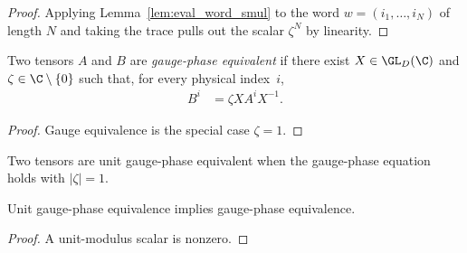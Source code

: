 \begin{proof}\leanok
    Applying Lemma~\ref{lem:eval_word_smul} to the word
    $w = (i_1, \ldots, i_N)$ of length $N$ and taking the trace pulls out the
    scalar $\zeta^{N}$ by linearity.
\end{proof}

\begin{definition}\label{def:gauge_phase_equiv}
    \leanok
    Two tensors $A$ and $B$ are \emph{gauge-phase equivalent}
    if there exist $X \in \GL_D(\C)$ and $\zeta \in \C \setminus \{0\}$
    such that, for every physical index~$i$,
    \begin{align}
        B^i
         & = \zeta X A^i X^{-1}.
        \label{eq:mps_gauge_phase_equiv}
    \end{align}
\end{definition}

\begin{proof}\leanok
    Gauge equivalence is the special case $\zeta = 1$.
\end{proof}

\begin{definition}
    \label{def:unit_gauge_phase_equiv}
    \leanok
    Two tensors are unit gauge-phase equivalent when the gauge-phase equation
    holds with $|\zeta|=1$.
\end{definition}

\begin{lemma}
    \label{lem:unit_gauge_phase_to_gauge_phase}
    \leanok
    Unit gauge-phase equivalence implies gauge-phase equivalence.
\end{lemma}

\begin{proof}\leanok
    A unit-modulus scalar is nonzero.
\end{proof}

